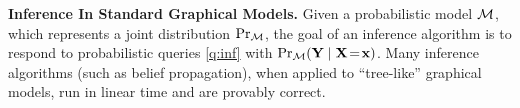 \documentclass[twoside]{article}
\begin{document}
\textbf{Inference In Standard Graphical Models.}
Given a probabilistic model $\cal M$, which represents a joint distribution $\Pr_{\cal M}$, the goal of an inference algorithm 
is to respond to probabilistic queries
\eqref{q:inf} with $\Pr_{\cal M}(\mathbf{Y} \mid \mathbf{X} \!=\! \mathbf{x})$. 
Many inference algorithms (such as belief propagation), 
when applied to ``tree-like'' graphical models,
run in linear time and are
provably correct.  
\end{document}

